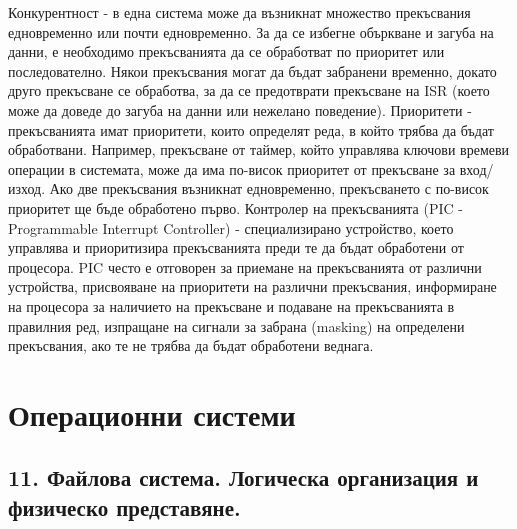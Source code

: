 \documentclass{article}
\begin{document}
Конкурентност - в една система може да възникнат множество прекъсвания едновременно или почти едновременно. За да се избегне объркване и загуба на
данни, е необходимо прекъсванията да се обработват по приоритет или последователно. Някои прекъсвания могат да бъдат забранени временно, докато друго
прекъсване се обработва, за да се предотврати прекъсване на ISR (което може да доведе до загуба на данни или нежелано поведение). \newline\newline
Приоритети - прекъсванията имат приоритети, които определят реда, в който трябва да бъдат обработвани. Например, прекъсване от таймер, който управлява
ключови времеви операции в системата, може да има по-висок приоритет от прекъсване за вход/изход. Ако две прекъсвания възникнат едновременно, прекъсването
с по-висок приоритет ще бъде обработено първо. \newline\newline
Контролер на прекъсванията (PIC - Programmable Interrupt Controller) - специализирано устройство, което управлява и приоритизира прекъсванията преди те да
бъдат обработени от процесора. PIC често е отговорен за приемане на прекъсванията от различни устройства, присвояване на приоритети на различни прекъсвания,
информиране на процесора за наличието на прекъсване и подаване на прекъсванията в правилния ред, изпращане на сигнали за забрана (masking) на определени
прекъсвания, ако те не трябва да бъдат обработени веднага.

\section*{\centering \color{bordeaux}Операционни системи}

\subsection*{\color{bordeaux}11. Файлова система. Логическа организация и физическо представяне.}
\end{document}
